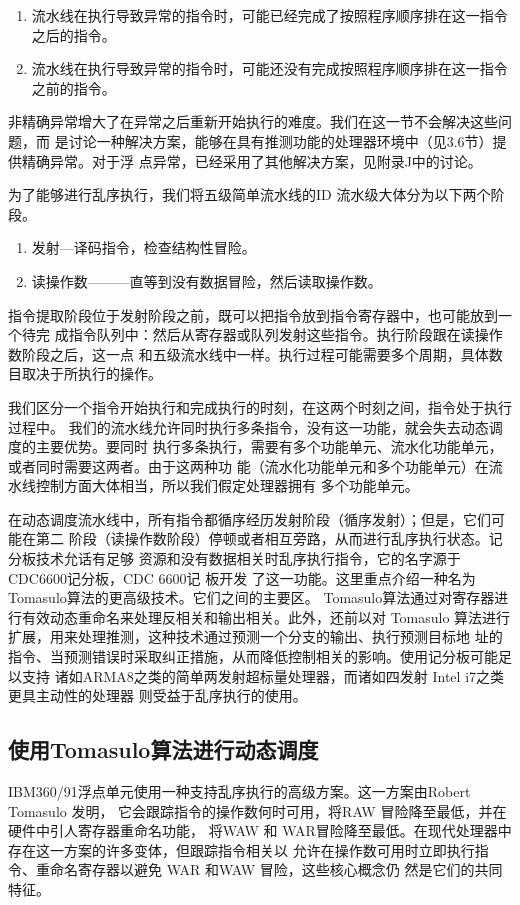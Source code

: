 \begin{enumerate}
    \item 流水线在执行导致异常的指令时，可能已经完成了按照程序顺序排在这一指令之后的指令。
    \item 流水线在执行导致异常的指令时，可能还没有完成按照程序顺序排在这一指令之前的指令。
\end{enumerate}

非精确异常增大了在异常之后重新开始执行的难度。我们在这一节不会解决这些问题，而
是讨论一种解决方案，能够在具有推测功能的处理器环境中（见3.6节）提供精确异常。对于浮
点异常，已经采用了其他解决方案，见附录J中的讨论。

为了能够进行乱序执行，我们将五级简单流水线的ID 流水级大体分为以下两个阶段。
\begin{enumerate}
    \item 发射—译码指令，检查结构性冒险。
    \item 读操作数———直等到没有数据冒险，然后读取操作数。
\end{enumerate}

指令提取阶段位于发射阶段之前，既可以把指令放到指令寄存器中，也可能放到一个待完
成指令队列中：然后从寄存器或队列发射这些指令。执行阶段跟在读操作数阶段之后，这一点
和五级流水线中一样。执行过程可能需要多个周期，具体数目取决于所执行的操作。

我们区分一个指令开始执行和完成执行的时刻，在这两个时刻之间，指令处于执行过程中。
我们的流水线允许同时执行多条指令，没有这一功能，就会失去动态调度的主要优势。要同时
执行多条执行，需要有多个功能单元、流水化功能单元，或者同时需要这两者。由于这两种功
能（流水化功能单元和多个功能单元）在流水线控制方面大体相当，所以我们假定处理器拥有
多个功能单元。

在动态调度流水线中，所有指令都循序经历发射阶段（循序发射）；但是，它们可能在第二
阶段（读操作数阶段）停顿或者相互旁路，从而进行乱序执行状态。记分板技术允话有足够
资源和没有数据相关时乱序执行指令，它的名字源于 CDC6600记分板，CDC 6600记
板开发
了这一功能。这里重点介绍一种名为 Tomasulo算法的更高级技术。它们之间的主要区。
Tomasulo算法通过对寄存器进行有效动态重命名来处理反相关和输出相关。此外，还前以对
Tomasulo 算法进行扩展，用来处理推测，这种技术通过预测一个分支的输出、执行预测目标地
址的指令、当预测错误时采取纠正措施，从而降低控制相关的影响。使用记分板可能足以支持
诸如ARMA8之类的简单两发射超标量处理器，而诸如四发射 Intel i7之类更具主动性的处理器
则受益于乱序执行的使用。

\subsection{使用Tomasulo算法进行动态调度}
IBM360/91浮点单元使用一种支持乱序执行的高级方案。这一方案由Robert Tomasulo 发明，
它会跟踪指令的操作数何时可用，将RAW 冒险降至最低，并在硬件中引人寄存器重命名功能，
将WAW 和 WAR冒险降至最低。在现代处理器中存在这一方案的许多变体，但跟踪指令相关以
允许在操作数可用时立即执行指令、重命名寄存器以避免 WAR 和WAW 冒险，这些核心概念仍
然是它们的共同特征。

